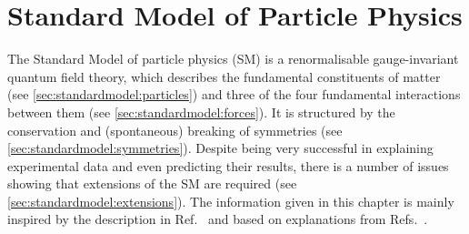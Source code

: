 
\chapter{Standard Model of Particle Physics}
\label{sec:standardmodel}

The Standard Model of particle physics (SM) is a renormalisable
gauge-invariant quantum field theory, which describes the fundamental
constituents of matter (see \cref{sec:standardmodel:particles}) and three of
the four fundamental interactions between them (see
\cref{sec:standardmodel:forces}). It is structured by the conservation
and (spontaneous) breaking of symmetries (see
\cref{sec:standardmodel:symmetries}). Despite being very successful in
explaining experimental data and even predicting their results, there is a
number of issues showing that extensions of the SM are required (see
\cref{sec:standardmodel:extensions}). The information given in this chapter is
mainly inspired by the description in Ref.~\cite{Brock:2011zz} and based on
explanations from Refs.~\cite{Griffiths:2008zz,Perkins:1982xb}.







